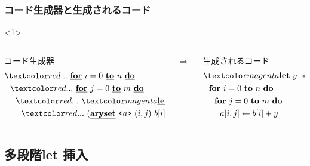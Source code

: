 \begin{frame}
  \frametitle{コード生成器と生成されるコード}

  \begin{onlyenv}<1>
    \begin{columns}
      \begin{column}{0.5\textwidth}%
        コード生成器
        \begin{align*}
          & \red{...}~ \cfordo{i = 0}{n} \\
          & ~~\red{...}~ \cfordo{j = 0}{m} \\
          & ~~~~\red{...}~ \magenta{\cLet~y=t~\cIn} \\
          & ~~~~~~\red{...}~ (\caryset{\code{a}}{(i,j)}{b[i] + y})
        \end{align*}
      \end{column}
      $\Rightarrow$
      \begin{column}{0.5\textwidth}%
        生成されるコード
        \begin{align*}
          & \magenta{\Let ~y ~= ~t ~\In} \\
          & ~~\fordo{i = 0}{n} \\
          & ~~~~\fordo{j = 0}{m} \\
          & ~~~~~~\aryset{a}{i,j}{b[i] + y}
        \end{align*}
      \end{column}
    \end{columns}
  \end{onlyenv}
\end{frame}



\subsection{多段階let 挿入}

